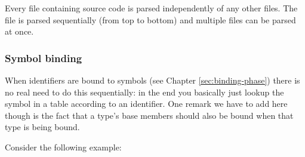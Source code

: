 Every file containing source code is parsed independently of any other files. The file is parsed sequentially (from top to bottom) and multiple files can be parsed at once.%

\subsubsection{Symbol binding }
\label{sec:concur-symbol-binding}

When identifiers are bound to symbols (see Chapter \ref{sec:binding-phase}) there is no real need to do this sequentially: in the end you basically just lookup the symbol in a table according to an identifier. One remark we have to add here though is the fact that a type's base members should also be bound when that type is being bound.

Consider the following example:

